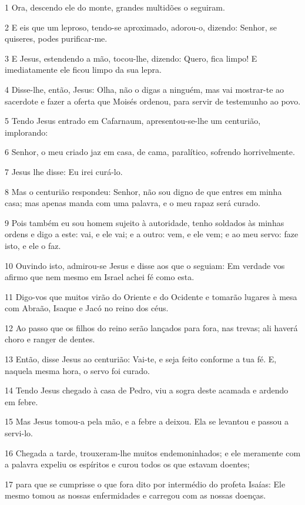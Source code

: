 \par 1 Ora, descendo ele do monte, grandes multidões o seguiram.
\par 2 E eis que um leproso, tendo-se aproximado, adorou-o, dizendo: Senhor, se quiseres, podes purificar-me.
\par 3 E Jesus, estendendo a mão, tocou-lhe, dizendo: Quero, fica limpo! E imediatamente ele ficou limpo da sua lepra.
\par 4 Disse-lhe, então, Jesus: Olha, não o digas a ninguém, mas vai mostrar-te ao sacerdote e fazer a oferta que Moisés ordenou, para servir de testemunho ao povo.
\par 5 Tendo Jesus entrado em Cafarnaum, apresentou-se-lhe um centurião, implorando:
\par 6 Senhor, o meu criado jaz em casa, de cama, paralítico, sofrendo horrivelmente.
\par 7 Jesus lhe disse: Eu irei curá-lo.
\par 8 Mas o centurião respondeu: Senhor, não sou digno de que entres em minha casa; mas apenas manda com uma palavra, e o meu rapaz será curado.
\par 9 Pois também eu sou homem sujeito à autoridade, tenho soldados às minhas ordens e digo a este: vai, e ele vai; e a outro: vem, e ele vem; e ao meu servo: faze isto, e ele o faz.
\par 10 Ouvindo isto, admirou-se Jesus e disse aos que o seguiam: Em verdade vos afirmo que nem mesmo em Israel achei fé como esta.
\par 11 Digo-vos que muitos virão do Oriente e do Ocidente e tomarão lugares à mesa com Abraão, Isaque e Jacó no reino dos céus.
\par 12 Ao passo que os filhos do reino serão lançados para fora, nas trevas; ali haverá choro e ranger de dentes.
\par 13 Então, disse Jesus ao centurião: Vai-te, e seja feito conforme a tua fé. E, naquela mesma hora, o servo foi curado.
\par 14 Tendo Jesus chegado à casa de Pedro, viu a sogra deste acamada e ardendo em febre.
\par 15 Mas Jesus tomou-a pela mão, e a febre a deixou. Ela se levantou e passou a servi-lo.
\par 16 Chegada a tarde, trouxeram-lhe muitos endemoninhados; e ele meramente com a palavra expeliu os espíritos e curou todos os que estavam doentes;
\par 17 para que se cumprisse o que fora dito por intermédio do profeta Isaías: Ele mesmo tomou as nossas enfermidades e carregou com as nossas doenças.

